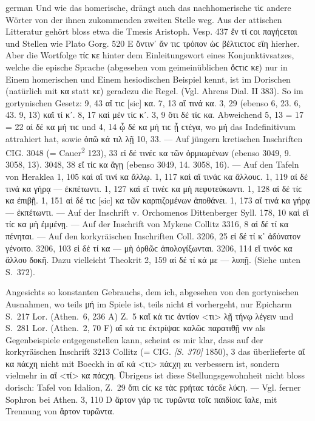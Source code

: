 \begin{otherlanguage*}{german}
Und wie das homerische, drängt auch das nachhomerische τὶϲ andere Wörter von der ihnen zukommenden zweiten Stelle weg. Aus der attischen Litteratur gehört bloss etwa die Tmesis Aristoph. Vesp. 437 ἔν τί ϲοι παγήϲεται und Stellen wie Plato Gorg. 520 E ὅντιν᾽ ἄν τιϲ τρόπον ὡϲ βέλτιϲτοϲ εἴη hierher. Aber die Wortfolge τίϲ κε hinter dem Einleitungswort eines Konjunktivsatzes, welche die epische Sprache (abgesehen vom geimeinüblichen ὅϲτιϲ κε) nur in Einem homerischen und Einem hesiodischen Beispiel kennt, ist im Dorischen (natürlich mit κα statt κε) geradezu die Regel. (Vgl. Ahrens Dial. II 383). So im gortynischen Gesetz: 9, 43 αἴ τιϲ [sic] κα. 7, 13 αἴ τινά κα. 3, 29 (ebenso 6, 23. 6, 43. 9, 13) καἴ τί κ᾽. 8, 17 καί μέν τίϲ κ᾽. 3, 9 ὅτι δέ τίϲ κα. Abweichend 5, 13 = 17 = 22 αἰ δέ κα μή τιϲ und 4, 14 ᾧ δέ κα μή τιϲ ᾖ ϲτέγα, wo μή das Indefinitivum attrahiert hat, sowie ὁπῶ κά τιλ λῇ 10, 33. — Auf jüngern kretischen Inschriften CIG. 3048 (= Cauer\textsuperscript{2} 123), 33 εἰ δέ τινέϲ κα τῶν ὁρμιωμένων (ebenso 3049, 9. 3058, 13). 3048, 38 εἴ τίϲ κα ἄγῃ (ebenso 3049, 14. 3058, 16). — Auf den Tafeln von Heraklea 1, 105 καὶ αἴ τινί κα ἄλλῳ. 1, 117 καὶ αἴ τινάϲ κα ἄλλουϲ. 1, 119 αἰ δέ τινά κα γήρᾳ — ἐκπέτωντι. 1, 127 καὶ εἴ τινέϲ κα μὴ πεφυτεύκωντι. 1, 128 αἰ δέ τίϲ κα ἐπιβῇ. 1, 151 αἰ δέ τιϲ [sic] κα τῶν καρπιζομένων ἀποθάνει. 1, 173 αἴ τινά κα γήρᾳ — ἐκπέτωντι. — Auf der Inschrift v. Orchomenos Dittenberger Syll. 178, 10 καὶ εἴ τίϲ κα μὴ ἐμμένῃ. — Auf der Inschrift von Mykene Collitz 3316, 8 αἰ δέ τί κα πένηται. — Auf den korkyräischen Inschriften Coll. 3206, 25 εἰ δέ τί κ᾽ ἀδύνατον γένοιτο. 3206, 103 εἰ δέ τί κα — μὴ ὀρθῶϲ ἀπολογίξωνται. 3206, 114 εἴ τινόϲ κα ἄλλου δοκῆ. Dazu vielleicht Theokrit 2, 159 αἰ δέ τί κά με — λυπῇ. (Siehe unten S.~372).

Angesichts so konstanten Gebrauchs, dem ich, abgesehen von den gortynischen Ausnahmen, wo teils μή im Spiele ist, teils nicht εἰ vorhergeht, nur Epi\-charm S.~217 Lor. (Athen.~6, 236 A) Z.~5 καἴ κά τιϲ ἀντίον <τι> λῇ τήνῳ λέγειν und S.~281 Lor. (Athen.~2, 70 F) αἴ κά τιϲ ἐκτρίψαϲ καλῶϲ παρατιθῇ νιν als Gegenbeispiele entgegenstellen kann, scheint es mir klar, dass auf der korkyräischen Inschrift 3213 Collitz (= CIG. \hypertarget{p370}{\emph{[S. 370]}}\label{p370} 1850), 3 das überlieferte αἴ κα πάϲχη nicht mit Boeckh in αἴ κά <τι> πάϲχη zu verbessern ist, sondern vielmehr in αἴ <τί> κα πάϲχη. Übrigens ist diese Stellungsgewohnheit nicht bloss dorisch: Tafel von Idalion, Z.~29 ὄπι ϲίϲ κε τὰϲ ϝρήταϲ τάϲδε λύϲη. — Vgl. ferner Sophron bei Athen. 3, 110 D ἄρτον γάρ τιϲ τυρῶντα τοῖϲ παιδίοιϲ ἴαλε, mit Trennung von ἄρτον τυρῶντα.


\end{otherlanguage*}
